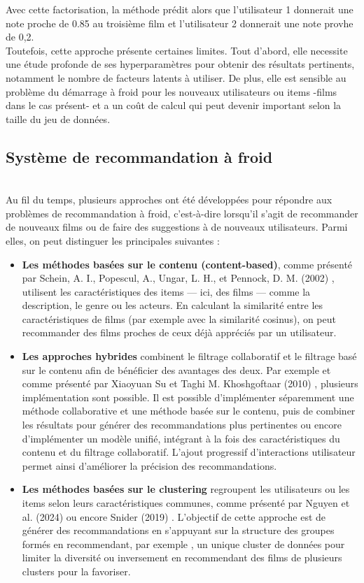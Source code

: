 \documentclass{article}
\begin{document}
Avec cette factorisation, la méthode prédit alors que l'utilisateur 1 donnerait une note
proche de 0.85 au troisième film et l'utilisateur 2 donnerait une note provhe de 0,2.\\
Toutefois, cette approche présente certaines limites. Tout d'abord, elle necessite une étude
profonde de ses hyperparamètres pour obtenir des résultats pertinents, notamment le nombre de
facteurs latents à utiliser. De plus, elle est sensible au problème du démarrage à froid pour
les nouveaux utilisateurs ou items -films dans le cas présent- et a un coût de calcul qui peut
devenir important selon la taille du jeu de données.

\subsection{Système de recommandation à froid}
$ $\\
Au fil du temps, plusieurs approches ont été développées pour répondre aux problèmes de recommandation à froid,
c’est-à-dire lorsqu’il s’agit de recommander de nouveaux films ou de faire des suggestions à de nouveaux utilisateurs.
Parmi elles, on peut distinguer les principales suivantes :
\begin{itemize}
    \item \textbf{Les méthodes basées sur le contenu (content-based)}, comme présenté par Schein, A. I., Popescul, A., Ungar, L. H.,
          et Pennock, D. M. (2002) \cite{schein2002_methods}, utilisent les caractéristiques des items — ici,
          des films — comme la description, le genre ou les acteurs. En calculant la similarité entre les caractéristiques
          de films (par exemple avec la similarité cosinus), on peut recommander des films proches de ceux déjà appréciés
          par un utilisateur.
    \item \textbf{Les approches hybrides} combinent le filtrage collaboratif et le filtrage basé sur le contenu afin
          de bénéficier des avantages des deux. Par exemple et comme présenté par Xiaoyuan Su et Taghi M. Khoshgoftaar (2010) \cite{su_cf_survey}, plusieurs implémentation sont possible. Il est possible
          d'implémenter séparemment une méthode collaborative et une méthode basée sur le contenu, puis de combiner les résultats pour générer des recommandations
          plus pertinentes ou encore d'implémenter un modèle unifié, intégrant à la fois des caractéristiques du contenu et du filtrage collaboratif.
          L’ajout progressif d’interactions utilisateur permet ainsi d’améliorer la précision des recommandations.
    \item \textbf{Les méthodes basées sur le clustering} regroupent les utilisateurs ou les items selon leurs caractéristiques
          communes, comme présenté par Nguyen et al. (2024)\cite{nguyen2024_ere} ou encore Snider (2019) \cite{snider_unsupervised}.
          L'objectif de cette approche est de générer des recommandations en s’appuyant sur la structure des groupes formés en recommendant, par exemple ,
          un unique cluster de données pour limiter la diversité ou inversement en recommendant des films de plusieurs clusters pour la favoriser.
\end{itemize}
\end{document}

